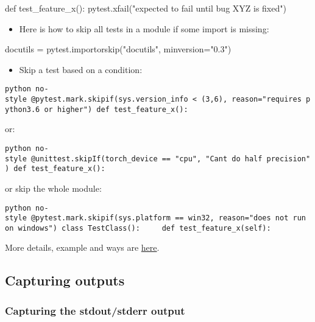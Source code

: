 \documentclass[
]{report}
\newenvironment{Shaded}{\begin{snugshade}}{\end{snugshade}}
\newcommand{\KeywordTok}[1]{\textcolor[rgb]{0.00,0.23,0.31}{#1}}
\newcommand{\NormalTok}[1]{\textcolor[rgb]{0.00,0.23,0.31}{#1}}
\newcommand{\OperatorTok}[1]{\textcolor[rgb]{0.37,0.37,0.37}{#1}}
\newcommand{\StringTok}[1]{\textcolor[rgb]{0.13,0.47,0.30}{#1}}
\providecommand{\tightlist}{%
  \setlength{\itemsep}{0pt}\setlength{\parskip}{0pt}}\usepackage{longtable,booktabs,array}
\begin{document}
\begin{Shaded}
\begin{Highlighting}[]
\KeywordTok{def}\NormalTok{ test\_feature\_x():}
\NormalTok{    pytest.xfail(}\StringTok{"expected to fail until bug XYZ is fixed"}\NormalTok{)}
\end{Highlighting}
\end{Shaded}

\begin{itemize}
\tightlist
\item
  Here is how to skip all tests in a module if some import is missing:
\end{itemize}

\begin{Shaded}
\begin{Highlighting}[]
\NormalTok{docutils }\OperatorTok{=}\NormalTok{ pytest.importorskip(}\StringTok{"docutils"}\NormalTok{, minversion}\OperatorTok{=}\StringTok{"0.3"}\NormalTok{)}
\end{Highlighting}
\end{Shaded}

\begin{itemize}
\tightlist
\item
  Skip a test based on a condition:
\end{itemize}

\texttt{python\ no-style\ @pytest.mark.skipif(sys.version\_info\ \textless{}\ (3,6),\ reason="requires\ python3.6\ or\ higher")\ def\ test\_feature\_x():}

or:

\texttt{python\ no-style\ @unittest.skipIf(torch\_device\ ==\ "cpu",\ "Can\textquotesingle{}t\ do\ half\ precision")\ def\ test\_feature\_x():}

or skip the whole module:

\texttt{python\ no-style\ @pytest.mark.skipif(sys.platform\ ==\ \textquotesingle{}win32\textquotesingle{},\ reason="does\ not\ run\ on\ windows")\ class\ TestClass():\ \ \ \ \ def\ test\_feature\_x(self):}

More details, example and ways are
\href{https://docs.pytest.org/en/latest/skipping.html}{here}.

\subsection{Capturing outputs}\label{capturing-outputs}

\subsubsection{Capturing the stdout/stderr
output}\label{capturing-the-stdoutstderr-output}
\end{document}
